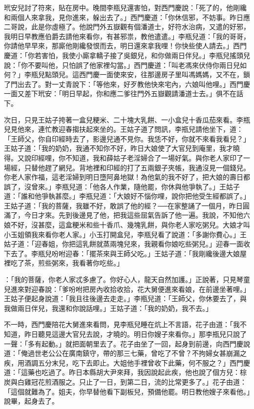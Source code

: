 玳安兒討了符來，貼在房中。晚間李瓶兒還害怕，對西門慶說：「死了的，他剛纔和兩個人來拿我，見你進來，躲出去了。」西門慶道：「你休信邪，不妨事。昨日應二哥說，此是你虛極了。他說門外五嶽觀有個潘道士，好符水治病，又遣的好邪，我明日早教應伯爵去請他來看你，有甚邪祟，教他遣遣。」李瓶兒道：「我的哥哥，你請他早早來，那廝他剛纔發恨而去，明日還來拿我哩！你快些使人請去。」西門慶道：「你若害怕，我使小廝拿轎子接了吳銀兒，和你做兩日伴兒。」李瓶兒搖頭兒說：「你不要叫他，只怕誤了他家裡勾當。」西門慶道：「叫老馮來伏侍你兩日兒如何？」李瓶兒點頭兒。這西門慶一面使來安，往那邊房子里叫馮媽媽，又不在，鎖了門出去了。對一丈青說下：「等他來，好歹教他快來宅內，六娘叫他哩。」西門慶一面又差下玳安：「明日早起，你和應二爹往門外五嶽觀請潘道士去。」俱不在話下。

次日，只見王姑子挎著一盒兒粳米、二十塊大乳餅、一小盒兒十香瓜茄來看。李瓶兒見他來，連忙教迎春搊扶起來坐的。王姑子道了問訊，李瓶兒請他坐下，道：「王師父，你自印經時去了，影邊兒通不見你。我恁不好，你就不來看我看兒？」王姑子道：「我的奶奶，我通不知你不好，昨日大娘使了大官兒到庵里，我才曉得。又說印經哩，你不知道，我和薛姑子老淫婦合了一場好氣。與你老人家印了一場經，只替他趕了網兒。背地裡和印經的打了五兩銀子夾帳，我通沒見一個錢兒。你老人家作福，這老淫婦到明日墮阿鼻地獄！為他氣的我不好了，把大娘的壽日都誤了，沒曾來。」李瓶兒道：「他各人作業，隨他罷，你休與他爭執了。」王姑子道：「誰和他爭執甚麼。」李瓶兒道：「大娘好不惱你哩，說你把他受生經都誤了。」王姑子道：「我的菩薩，我雖不好，敢誤了他的經？──在家整誦了一個月，昨日圓滿了，今日才來。先到後邊見了他，把我這些屈氣告訴了他一遍。我說，不知他六娘不好，沒甚麼，這盒粳米和些十香爪、幾塊乳餅，與你老人家吃粥兒。大娘才叫小玉姐領我來看你老人家。」小玉打開盒兒，李瓶兒看了說道：「多謝你費心。」王姑子道：「迎春姐，你把這乳餅就蒸兩塊兒來，我親看你娘吃些粥兒。」迎春一面收下去了。李瓶兒吩咐迎春：「擺茶來與王師父吃。」王姑子道：「我剛纔後邊大娘屋裡吃了茶，煎些粥來，我看著你吃些。」

：「我的菩薩，你老人家忒多慮了。你好心人，龍天自然加護。」正說著，只見琴童兒進來對迎春說：「爹吩咐把房內收拾收拾，花大舅便進來看娘，在前邊坐著哩。」王姑子便起身說道：「我且往後邊去走走。」李瓶兒道：「王師父，你休要去了，與我做兩日伴兒，我還和你說話哩。」王姑子道：「我的奶奶，我不去。」

不一時，西門慶陪花大舅進來看問，見李瓶兒睡在炕上不言語，花子由道：「我不知道，昨日聽見這邊大官兒去說，才曉的。明日你嫂子來看你。」那李瓶兒只說了一聲：「多有起動。」就把面朝里去了。花子由坐了一回，起身到前邊，向西門慶說道：「俺過世老公公在廣南鎮守，帶的那三七藥，曾吃了不曾？不拘婦女甚崩漏之疾，用酒調五分末兒，吃下去即止。大姐他手裡曾收下此藥，何不服之？」西門慶道：「這藥也吃過了。昨日本縣胡大尹來拜，我因說起此疾，他也說了個方兒：棕炭與白雞冠花煎酒服之。只止了一日，到第二日，流的比常更多了。」花子由道：「這個就難為了。姐夫，你早替他看下副板兒，預備他罷。明日教他嫂子來看他。」說畢，起身去了。

